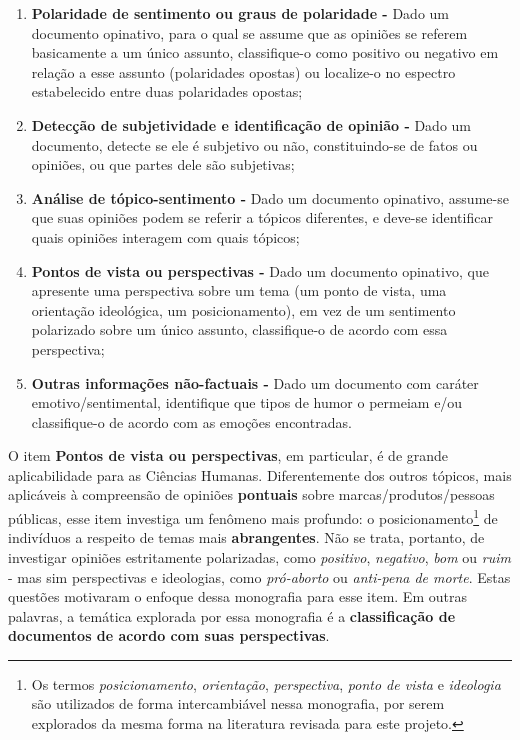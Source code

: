 \begin{enumerate}
    \item \textbf{Polaridade de sentimento ou graus de polaridade -} Dado um documento opinativo, para o qual se assume que as opiniões se referem basicamente a um único assunto, classifique-o como positivo ou negativo em relação a esse assunto (polaridades opostas) ou localize-o no espectro estabelecido entre duas polaridades opostas;
    \item \textbf{Detecção de subjetividade e identificação de opinião -} Dado um documento, detecte se ele é subjetivo ou não, constituindo-se de fatos ou opiniões, ou que partes dele são subjetivas;
    \item \textbf{Análise de tópico-sentimento -} Dado um documento opinativo, assume-se que suas opiniões podem se referir a tópicos diferentes, e deve-se identificar quais opiniões interagem com quais tópicos;
   \item \textbf{Pontos de vista ou perspectivas -} Dado um documento opinativo, que apresente uma perspectiva sobre um tema (um ponto de vista, uma orientação ideológica, um posicionamento), em vez de um sentimento polarizado sobre um único assunto, classifique-o de acordo com essa perspectiva;
   \item \textbf{Outras informações não-factuais -} Dado um documento com caráter emotivo/sentimental, identifique que tipos de humor o permeiam e/ou classifique-o de acordo com as emoções encontradas.

\end{enumerate}

O item \textbf{Pontos de vista ou perspectivas}, em particular, é de grande aplicabilidade para as Ciências Humanas. Diferentemente dos outros tópicos, mais aplicáveis à compreensão de opiniões \textbf{pontuais} sobre marcas/produtos/pessoas públicas, esse item investiga um fenômeno mais profundo: o posicionamento\footnote{Os termos \emph{posicionamento}, \emph{orientação}, \emph{perspectiva}, \emph{ponto de vista} e \emph{ideologia} são utilizados de forma intercambiável nessa monografia, por serem explorados da mesma forma na literatura revisada para este projeto.} de indivíduos a respeito de temas mais \textbf{abrangentes}. Não se trata, portanto, de investigar opiniões estritamente polarizadas, como \emph{positivo}, \emph{negativo}, \emph{bom} ou \emph{ruim} - mas sim perspectivas e ideologias, como \emph{pró-aborto} ou \emph{anti-pena de morte}. Estas questões motivaram o enfoque dessa monografia para esse item. Em outras palavras, a temática explorada por essa monografia é a \textbf{classificação de documentos de acordo com suas perspectivas}.

